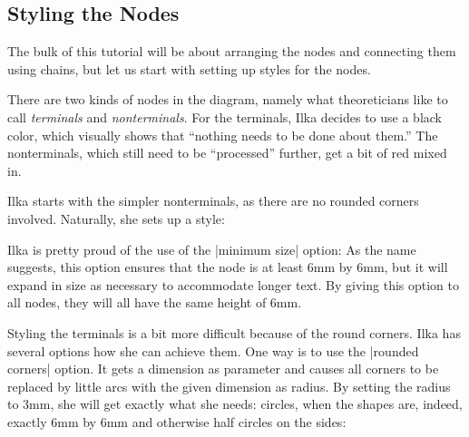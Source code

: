 \subsection{Styling the Nodes}

The bulk of this tutorial will be about arranging the nodes and
connecting them using chains, but let us start with setting up styles
for the nodes.

There are two kinds of nodes in the diagram, namely what theoreticians
like to call \emph{terminals} and \emph{nonterminals}. For the
terminals, Ilka decides to use a black color, which visually shows
that ``nothing needs to be done about them.'' The nonterminals, which
still need to be ``processed'' further, get a bit of red mixed in.

Ilka starts with the simpler nonterminals, as there are no rounded
corners involved. Naturally, she sets up a style:


\begin{codeexample}[]
\end{codeexample}
Ilka is pretty proud of the use of the |minimum size| option: As the
name suggests, this option ensures that the node is at least 6mm by
6mm, but it will expand in size as necessary to accommodate longer
text. By giving this option to all nodes, they will all have the same
height of 6mm.

Styling the terminals is a bit more difficult because of the round
corners. Ilka has several options how she can achieve them. One way
is to use the |rounded corners| option. It gets a dimension as
parameter and causes all corners to be replaced by little arcs with
the given dimension as radius. By setting the radius to 3mm, she will
get exactly what she needs: circles, when the shapes are, indeed,
exactly 6mm by 6mm and otherwise half circles on the sides:

\begin{codeexample}[]
\end{codeexample}

